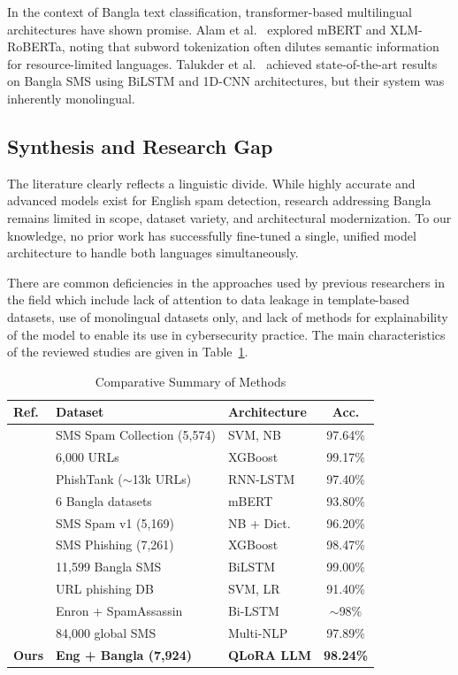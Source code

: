 \documentclass[journal]{IEEEtran}
\begin{document}
In the context of Bangla text classification, transformer-based multilingual architectures have shown promise. Alam et al.~\cite{ref4} explored mBERT and XLM-RoBERTa, noting that subword tokenization often dilutes semantic information for resource-limited languages. Talukder et al.~\cite{ref7} achieved state-of-the-art results on Bangla SMS using BiLSTM and 1D-CNN architectures, but their system was inherently monolingual.

\subsection{Synthesis and Research Gap}

The literature clearly reflects a linguistic divide. While highly accurate and advanced models exist for English spam detection, research addressing Bangla remains limited in scope, dataset variety, and architectural modernization. To our knowledge, no prior work has successfully fine-tuned a single, unified model architecture to handle both languages simultaneously.

There are common deficiencies in the approaches used by
previous researchers in the field which include lack of attention to
data leakage in template-based datasets, use of monolingual datasets
only, and lack of methods for explainability of the model to enable its
use in cybersecurity practice. The main characteristics of the reviewed
studies are given in Table~\ref{tab:comparative}.

\begin{table}[htbp]
\caption{Comparative Summary of Methods}
\label{tab:comparative}
\centering
\begin{tabular}{lllc}
\toprule
\textbf{Ref.} & \textbf{Dataset} & \textbf{Architecture} & \textbf{Acc.} \\
\midrule
\cite{ref1} & SMS Spam Collection (5,574) & SVM, NB & 97.64\% \\
\cite{ref2} & 6,000 URLs & XGBoost & 99.17\% \\
\cite{ref3} & PhishTank ($\sim$13k URLs) & RNN-LSTM & 97.40\% \\
\cite{ref4} & 6 Bangla datasets & mBERT & 93.80\% \\
\cite{ref5} & SMS Spam v1 (5,169) & NB + Dict. & 96.20\% \\
\cite{ref6} & SMS Phishing (7,261) & XGBoost & 98.47\% \\
\cite{ref7} & 11,599 Bangla SMS & BiLSTM & 99.00\% \\
\cite{ref8} & URL phishing DB & SVM, LR & 91.40\% \\
\cite{ref9} & Enron + SpamAssassin & Bi-LSTM & $\sim$98\% \\
\cite{ref10} & 84,000 global SMS & Multi-NLP & 97.89\% \\
\textbf{Ours} & \textbf{Eng + Bangla (7,924)} & \textbf{QLoRA LLM} & \textbf{98.24\%} \\
\bottomrule
\end{tabular}
\end{table}
\end{document}
